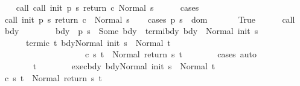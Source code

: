\begin{isabellebody}
\ \ \isamarkupfalse%
\ call{\isacharcolon}\ {\isachardoublequoteopen}{\isasymGamma}{\isasymturnstile}call\ init\ {\isacharparenleft}p\ s{\isacharparenright}\ return{\isacharprime}\ c{\isasymdown}\ Normal\ s{\isachardoublequoteclose}\isanewline
\ \ \ \ \isamarkupfalse%
\ cases\isanewline
\ \ \isamarkupfalse%
\ {\isachardoublequoteopen}{\isasymGamma}{\isasymturnstile}call\ init\ {\isacharparenleft}p\ s{\isacharparenright}\ return\ c\ {\isasymdown}\ Normal\ s{\isachardoublequoteclose}\isanewline
\ \ \isamarkupfalse%
\ {\isacharparenleft}cases\ {\isachardoublequoteopen}p\ s\ {\isasymin}\ dom\ {\isasymGamma}{\isachardoublequoteclose}{\isacharparenright}\isanewline
\ \ \ \ \isamarkupfalse%
\ True\isanewline
\ \ \ \ \isamarkupfalse%
\ call\ \isamarkupfalse%
\ bdy\ \ \isanewline
\ \ \ \ \ \ bdy{\isacharcolon}\ {\isachardoublequoteopen}{\isasymGamma}\ {\isacharparenleft}p\ s{\isacharparenright}\ {\isacharequal}\ Some\ bdy{\isachardoublequoteclose}\ \ termi{\isacharunderscore}bdy{\isacharcolon}\ {\isachardoublequoteopen}{\isasymGamma}{\isasymturnstile}bdy\ {\isasymdown}\ Normal\ {\isacharparenleft}init\ s{\isacharparenright}{\isachardoublequoteclose}\ \ \isanewline
\ \ \ \ \ \ termi{\isacharunderscore}c{\isacharcolon}\ {\isachardoublequoteopen}{\isasymforall}t{\isachardot}\ {\isasymGamma}{\isasymturnstile}{\isasymlangle}bdy{\isacharcomma}Normal\ {\isacharparenleft}init\ s{\isacharparenright}{\isasymrangle}\ {\isasymRightarrow}\ Normal\ t\ {\isasymlongrightarrow}\ \isanewline
\ \ \ \ \ \ \ \ \ \ \ \ \ \ \ \ \ \ \ \ {\isasymGamma}{\isasymturnstile}c\ s\ t\ {\isasymdown}\ Normal\ {\isacharparenleft}return{\isacharprime}\ s\ t{\isacharparenright}{\isachardoublequoteclose}\isanewline
\ \ \ \ \ \ \isamarkupfalse%
\ cases\ auto\ \isanewline
\ \ \ \ \isacommand{{\isacharbraceleft}}\isamarkupfalse%
\isanewline
\ \ \ \ \ \ \isamarkupfalse%
\ t\isanewline
\ \ \ \ \ \ \isamarkupfalse%
\ exec{\isacharunderscore}bdy{\isacharcolon}\ {\isachardoublequoteopen}{\isasymGamma}{\isasymturnstile}{\isasymlangle}bdy{\isacharcomma}Normal\ {\isacharparenleft}init\ s{\isacharparenright}{\isasymrangle}\ {\isasymRightarrow}\ Normal\ t{\isachardoublequoteclose}\isanewline
\ \ \ \ \ \ \isamarkupfalse%
\ {\isachardoublequoteopen}{\isasymGamma}{\isasymturnstile}c\ s\ t\ {\isasymdown}\ Normal\ {\isacharparenleft}return\ s\ t{\isacharparenright}{\isachardoublequoteclose}\isanewline

\end{isabellebody}
